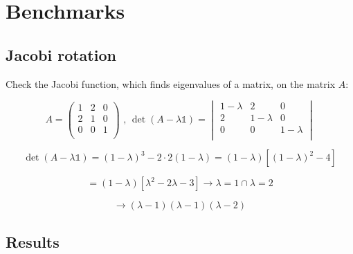 \documentclass[11pt]{article}
\begin{document}
\section*{Benchmarks}

\subsection*{Jacobi rotation}

\begin{flushleft}
Check the Jacobi function, which finds eigenvalues of a matrix, on the matrix $A$:

\begin{equation*}
A = 
\begin{pmatrix}
1 & 2 & 0\\
2 & 1 & 0\\
0 & 0 & 1\\
\end{pmatrix} \text{ , }
\det (A - \lambda \mathbb{1} ) = 
\begin{vmatrix}
1 - \lambda & 2 & 0\\
2 & 1 - \lambda & 0\\
0 & 0 & 1- \lambda\\
\end{vmatrix}
\end{equation*}

$$
\det (A - \lambda \mathbb{1} ) =
(1-\lambda)^3 - 2 \cdot 2(1 - \lambda) = (1 - \lambda)[(1 - \lambda)^2 - 4]
$$

$$
= (1 - \lambda)[\lambda^2 - 2\lambda - 3] \rightarrow \lambda = 1 \cap \lambda = 2
$$

$$
\rightarrow (\lambda - 1)(\lambda - 1)(\lambda - 2)
$$

\end{flushleft}

\subsection*{Results}

\begin{flushleft}
\end{flushleft}
\end{document}
